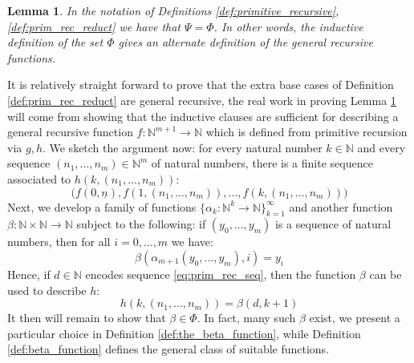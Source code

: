 \documentclass[12pt]{article}
\theoremstyle{plain}
\newtheorem{lemma}[thm]{Lemma}
\theoremstyle{definition}
\newcommand{\bb}[1]{\mathbb{#1}}
\newcommand{\lto}{\longrightarrow}
\begin{document}
	\begin{lemma}\label{lem:prim_rec_alt_defn}
		In the notation of Definitions \ref{def:primitive_recursive}, \ref{def:prim_rec_reduct} we have that $\Psi = \Phi$. In other words, the inductive definition of the set $\Phi$ gives an alternate definition of the general recursive functions.
	\end{lemma}
	It is relatively straight forward to prove that the extra base cases of Definition \ref{def:prim_rec_reduct} are general recursive, the real work in proving Lemma \ref{lem:prim_rec_alt_defn} will come from showing that the inductive clauses are sufficient for describing a general recursive function $f: \bb{N}^{m+1} \lto \bb{N}$ which is defined from primitive recursion via $g,h$. We sketch the argument now: for every natural number $k \in \bb{N}$ and every sequence $(n_1,...,n_m) \in \bb{N}^m$ of natural numbers, there is a finite sequence associated to $h(k,(n_1,...,n_m))$:
	\begin{equation}\label{eq:prim_rec_seq}
		\big(f(0,\underline{n}), f(1,(n_1,...,n_m)),...,f(k,(n_1,...,n_m))\big)
	\end{equation}
	Next, we develop a family of functions $\lbrace \alpha_k: \bb{N}^k \lto \bb{N}\rbrace_{k = 1}^\infty$ and another function $\beta: \bb{N} \times \bb{N} \lto \bb{N}$ subject to the following: if $(y_0,...,y_m)$ is a sequence of natural numbers, then for all $i = 0,...,m$ we have:
	\begin{equation}
		\beta(\alpha_{m+1}(y_0,...,y_m),i) = y_i
	\end{equation}
	Hence, if $d \in \bb{N}$ encodes sequence \eqref{eq:prim_rec_seq}, then the function $\beta$ can be used to describe $h$:
	\begin{equation}
		h(k,(n_1,...,n_m)) = \beta(d,k+1)
	\end{equation}
	It then will remain to show that $\beta \in \Phi$. In fact, many such $\beta$ exist, we present a particular choice in Definition \ref{def:the_beta_function}, while Definition \ref{def:beta_function} defines the general class of suitable functions.
	
\end{document}
